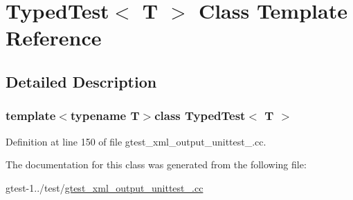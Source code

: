 \hypertarget{classTypedTest}{\section{\-Typed\-Test$<$ \-T $>$ \-Class \-Template \-Reference}
\label{de/d87/classTypedTest}
}


\subsection{\-Detailed \-Description}
\subsubsection*{template$<$typename T$>$class Typed\-Test$<$ T $>$}



\-Definition at line 150 of file gtest\-\_\-xml\-\_\-output\-\_\-unittest\-\_\-.\-cc.



\-The documentation for this class was generated from the following file\-:\begin{DoxyCompactItemize}
\item 
gtest-\/1../test/\hyperlink{gtest__xml__output__unittest___8cc}{gtest\-\_\-xml\-\_\-output\-\_\-unittest\-\_\-.\-cc}\end{DoxyCompactItemize}
